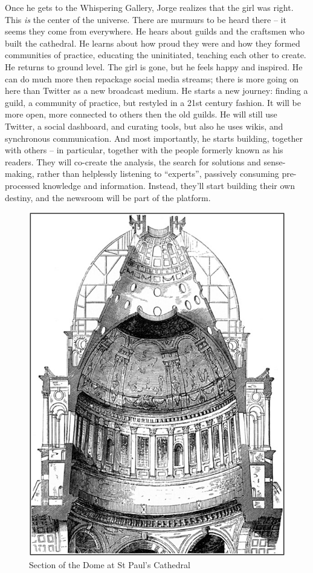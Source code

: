 Once he gets to the Whispering Gallery, Jorge realizes that the girl was
right. This \emph{is} the center of the universe. There are murmurs to
be heard there -- it seems they come from everywhere. He hears about
guilds and the craftsmen who built the cathedral. He learns about how
proud they were and how they formed communities of practice, educating
the uninitiated, teaching each other to create. He returns to ground
level. The girl is gone, but he feels happy and inspired. He can do much
more then repackage social media streams; there is more going on here
than Twitter as a new broadcast medium. He starts a new journey: finding
a guild, a community of practice, but restyled in a 21st century
fashion. It will be more open, more connected to others then the old
guilds. He will still use Twitter, a social dashboard, and curating
tools, but also he uses wikis, and synchronous communication. And most
importantly, he starts building, together with others -- in particular,
together with the people formerly known as his readers. They will
co-create the analysis, the search for solutions and sense-making,
rather than helplessly listening to ``experts'', passively consuming
pre-processed knowledge and information. Instead, they'll start building
their own destiny, and the newsroom will be part of the platform.

\begin{figure}[htbp]
\centering
\includegraphics[width=.8\textwidth]{../pictures/section.jpg}
\caption*{Section of the Dome at St Paul's Cathedral}
\end{figure}
